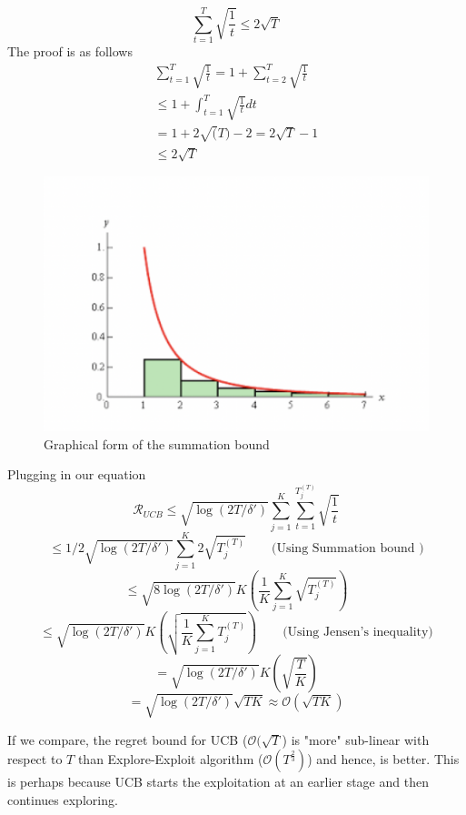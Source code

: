 \documentclass[11pt]{article}
\begin{document}
$$\sum_{t=1}^{T}\sqrt{\frac{1}{t}} \le 2\sqrt{T}$$
The proof is as follows
\begin{align*}
    \sum_{t=1}^{T}\sqrt{\frac{1}{t}} = 1 + \sum_{t=2}^{T}\sqrt{\frac{1}{t}} \\
    \le 1 + \int_{t=1}^{T} \sqrt{\frac{1}{t}}dt \\
    = 1 + 2 \sqrt(T) - 2 = 2 \sqrt{T} - 1 \\
    \le 2 \sqrt{T}
\end{align*}
\begin{figure}[h]
    \centering
    \includegraphics[scale=0.5]{figs/Screen Shot 2022-03-04 at 12.30.28 AM.png}
    \caption{Graphical form of the summation bound}
    \label{fig:my_label}
\end{figure}


\normalfont
Plugging in our equation
$$\mathcal{R}_{UCB} \le \sqrt{\log(2T/\delta')} \sum_{j=1}^K \sum_{t=1}^{T_j^{(T)}} \sqrt{\frac{1}{t}}$$
$$\le 1/2\sqrt{\log(2T/\delta')} \sum_{j=1}^K 2\sqrt{T_j^{(T)}} \qquad \text{(Using Summation bound )}$$
$$\le \sqrt{8\log(2T/\delta')} K \left(\frac{1}{K}\sum_{j=1}^K \sqrt{T_j^{(T)}} \right)$$
$$\le \sqrt{\log(2T/\delta')} K \left( \sqrt{\frac{1}{K}\sum_{j=1}^K T_j^{(T)}} \right)  \qquad \text{(Using Jensen's inequality)}$$
$$= \sqrt{\log(2T/\delta')} K \left( \sqrt{\frac{T}{K}} \right)$$
$$= \sqrt{\log(2T/\delta')} \sqrt{TK} \approx \mathcal{O}(\sqrt{TK})$$

If we compare, the regret bound for UCB ($\mathcal{O}(\sqrt{T}$) is "more" sub-linear with respect to $T$ than Explore-Exploit algorithm ($\mathcal{O}(T^{\frac{2}{3}})$) and hence, is better. This is perhaps because UCB starts the exploitation at an earlier stage and then continues exploring.
\end{document}
